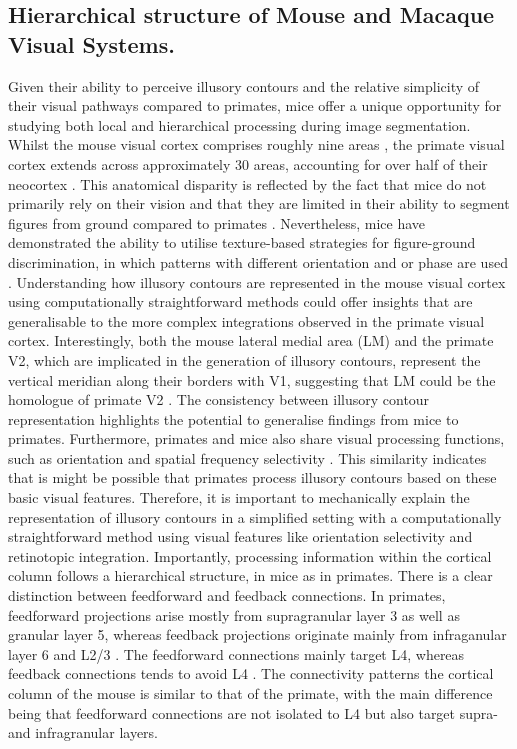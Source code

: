 \documentclass[12pt]{article}
\begin{document}
\subsection{Hierarchical structure of Mouse and Macaque Visual Systems.}
Given their ability to perceive illusory contours and the relative simplicity of their visual pathways compared to primates, mice offer a unique opportunity for studying both local and hierarchical processing during image segmentation. Whilst the mouse visual cortex comprises roughly nine areas \autocite{wangAreaMapMouse2007}, the primate visual cortex extends across approximately 30 areas, accounting for over half of their neocortex \autocite{fellemanDistributedHierarchicalProcessing1991}. This anatomical disparity is reflected by the fact that mice do not primarily rely on their vision and that they are limited in their ability to segment figures from ground compared to primates \autocite{luongoMicePrimatesUse2023}. Nevertheless, mice have demonstrated the ability to utilise texture-based strategies for figure-ground discrimination, in which patterns with different orientation and or phase are used \autocite{kirchbergerEssentialRoleFeedback2020}. Understanding how illusory contours are represented in the mouse visual cortex using computationally straightforward methods could offer insights that are generalisable to the more complex integrations observed in the primate visual cortex. Interestingly, both the mouse lateral medial area (LM) and the primate V2, which are implicated in the generation of illusory contours, represent the vertical meridian along their borders with V1, suggesting that LM could be the homologue of primate V2 \autocite{gamanutAnatomicalFunctionalConnectomes2022}. The consistency between illusory contour representation highlights the potential to generalise findings from mice to primates. Furthermore, primates and mice also share visual processing functions, such as orientation and spatial frequency selectivity \autocite{niellHighlySelectiveReceptive2008}. This similarity indicates that is might be possible that primates process illusory contours based on these basic visual features. Therefore, it is important to mechanically explain the representation of illusory contours in a simplified setting with a computationally straightforward method using visual features like orientation selectivity and retinotopic integration. Importantly, processing information within the cortical column follows a hierarchical structure, in mice as in primates. There is a clear distinction between feedforward and feedback connections. In primates, feedforward projections arise mostly from supragranular layer 3 as well as granular layer 5, whereas feedback projections originate mainly from infraganular layer 6 and L2/3 \autocite{markovAnatomyHierarchyFeedforward2014}. The feedforward connections mainly target L4, whereas feedback connections tends to avoid L4 \autocite{rocklandWhatWeKnow2019}. The connectivity patterns the cortical column of the mouse is similar to that of the primate, with the main difference being that feedforward connections are not isolated to L4 but also target supra- and infragranular layers. 
\end{document}
